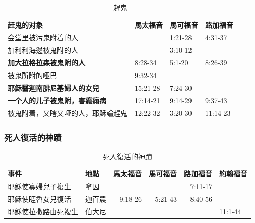 \begin{table}[htbp]
  \centering
    \begin{tabular}{|p{16.855em}|l|l|l|}
    \toprule
    \multicolumn{1}{|p{10.215em}|}{\textbf{赶鬼的对象}} & \multicolumn{1}{p{4.215em}|}{\textbf{馬太福音}} & \multicolumn{1}{p{4.215em}|}{\textbf{馬可福音}} & \multicolumn{1}{p{4.215em}|}{\textbf{路加福音}} \\
    \midrule
    会堂里被污鬼附着的人 &       & 1:21-28 & 4:31-37  \\
      \midrule
    加利利海邊被鬼附的人 &       & 3:10-12  &  \\
    \midrule
    \textbf{加大拉格拉森被鬼附的人 } & 8:28-34 & 5:1-20 & 8:26-39 \\
    \midrule
    被鬼所附的哑巴 & 9:32-34 &       &   \\
    \midrule
    \textbf{耶穌醫迦南腓尼基婦人的女兒} & 15:21-28 & 7:24-30 &  \\
    \midrule
    \textbf{一个人的儿子被鬼附，害癫痫病} & 17:14-21 & 9:14-29 & 9:37-43  \\
    \midrule
    被鬼附着，又瞎又哑的人，耶穌論趕鬼 & 12:22-32 & 3:20-30 & 11:14-23  \\
    \bottomrule
    \end{tabular}%
     \caption{趕鬼}
  \label{tab:addlabel}%
\end{table}%


\subsubsection{死人復活的神蹟}

\begin{table}[htbp]
  \centering 
    \begin{tabular}{|p{11.145em}|p{5.145em}|r|r|r|l|}
    \toprule
    \textbf{事件} & \textbf{地點} & \multicolumn{1}{p{6.215em}|}{\textbf{馬太福音}} & \multicolumn{1}{p{5.215em}|}{\textbf{馬可福音}} & \multicolumn{1}{p{6.5em}|}{\textbf{路加福音}} & \multicolumn{1}{p{5em}|}{\textbf{約翰福音}} \\
    \midrule
    耶穌使寡婦兒子複生 & 拿因    &       &       & \multicolumn{1}{p{6.5em}|}{7:11-17} &  \\
    \midrule
    耶穌使睚魯女兒復活 & 迦百農   & \multicolumn{1}{p{6.215em}|}{9:18-26} & \multicolumn{1}{p{5.215em}|}{5:21-43} & \multicolumn{1}{p{6.5em}|}{8:40-56} &  \\
    \midrule
    耶穌使拉撒路由死複生 & 伯大尼   &       &       &       & 11:1-44 \\
    \bottomrule
    \end{tabular}%
      \caption{死人復活的神蹟}
  \label{tab:addlabel}%
\end{table}%


